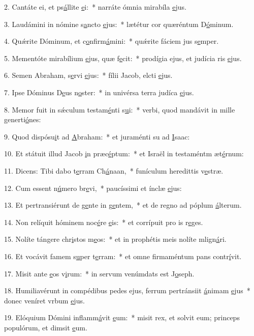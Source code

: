 2. Cantáte ei, et ps\uline{á}llite \uline{e}i:~* narráte ómnia mirabíla \uline{e}jus.\par 
3. Laudámini in nómine s\uline{a}ncto \uline{e}jus:~* lætétur cor quæréntum D\uline{ó}minum.\par 
4. Quǽrite Dóminum, et c\uline{o}nfirm\uline{á}mini:~* quǽrite fáciem jus s\uline{e}mper.\par 
5. Mementóte mirabílium \uline{e}jus, quæ f\uline{e}cit:~* prodígia ejus, et judícia ris \uline{e}jus.\par 
6. Semen Abraham, s\uline{e}rvi \uline{e}jus:~* fílii Jacob, elcti \uline{e}jus.\par 
7. Ipse Dóminus D\uline{e}us n\uline{o}ster:~* in univérsa terra judíca \uline{e}jus.\par 
8. Memor fuit in sǽculum testam\uline{é}nti s\uline{u}i:~* verbi, quod mandávit in mille generti\uline{ó}nes:\par 
9. Quod dispósu\uline{i}t ad \uline{A}braham:~* et juraménti su ad \uline{I}saac:\par 
10. Et státuit illud Jacob \uline{i}n præc\uline{é}ptum:~* et Israël in testaméntm æt\uline{é}rnum:\par 
11. Dicens: Tibi dabo t\uline{e}rram Ch\uline{á}naan,~* funículum heredittis v\uline{e}stræ.\par 
12. Cum essent n\uline{ú}mero br\uline{e}vi,~* paucíssimi et ínclæ \uline{e}jus:\par 
13. Et pertransiérunt de g\uline{e}nte in g\uline{e}ntem,~* et de regno ad póplum \uline{á}lterum.\par 
14. Non relíquit hóminem noc\uline{é}re \uline{e}is:~* et corrípuit pro is r\uline{e}ges.\par 
15. Nolíte tángere chr\uline{i}stos m\uline{e}os:~* et in prophétis meis nolíte mlign\uline{á}ri.\par 
16. Et vocávit famem s\uline{u}per t\uline{e}rram:~* et omne firmaméntum pans contr\uline{í}vit.\par 
17. Misit ante \uline{e}os v\uline{i}rum:~* in servum venúmdats est J\uline{o}seph.\par 
18. Humiliavérunt in compédibus pedes ejus, ferrum pertránsiit \uline{á}nimam \uline{e}jus~* donec veníret vrbum \uline{e}jus.\par 
19. Elóquium Dómini inflamm\uline{á}vit \uline{e}um:~* misit rex, et solvit eum; princeps populórum, et dimsit \uline{e}um.\par 
